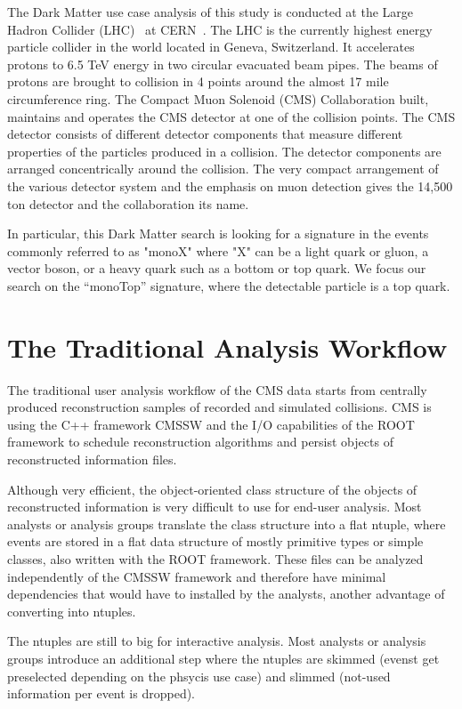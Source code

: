 \documentclass[a4paper]{jpconf}
\begin{document}
The Dark Matter use case analysis of this study is conducted at the Large Hadron Collider (LHC)~\cite{lhc} at CERN~\cite{cern}. The LHC is the currently highest energy particle collider in the world located in Geneva, Switzerland. It accelerates protons to 6.5 TeV energy in two circular evacuated beam pipes. The beams of protons are brought to collision in 4 points around the almost 17­ mile circumference ring. The Compact Muon Solenoid (CMS) Collaboration built, maintains and operates the CMS detector at one of the collision points. The CMS detector consists of different detector components that measure different properties of the particles produced in a collision. The detector components are arranged concentrically around the collision. The very compact arrangement of the various detector system and the emphasis on muon detection gives the 14,500 ton detector and the collaboration its name.

In particular, this Dark Matter search is looking for a signature in the events commonly referred to as "monoX" where "X" can be a light quark or gluon, a vector boson, or a heavy quark such as a bottom or top quark. We focus our search on the “monoTop” signature, where the detectable particle is a top quark.

\section{The Traditional Analysis Workflow}

The traditional user analysis workflow of the CMS data starts from centrally produced reconstruction samples of recorded and simulated collisions. CMS is using the C++ framework CMSSW and the I/O capabilities of the ROOT framework to schedule reconstruction algorithms and persist objects of reconstructed information files.

Although very efficient, the object-oriented class structure of the objects of reconstructed information is very difficult to use for end-user analysis. Most analysts or analysis groups translate the class structure into a flat ntuple, where events are stored in a flat data structure of mostly primitive types or simple classes, also written with the ROOT framework. These files can be analyzed independently of the CMSSW framework and therefore have minimal dependencies that would have to installed by the analysts, another advantage of converting into ntuples.

The ntuples are still to big for interactive analysis. Most analysts or analysis groups introduce an additional step where the ntuples are skimmed (evenst get preselected depending on the phsycis use case) and slimmed (not-used information per event is dropped).
\end{document}
